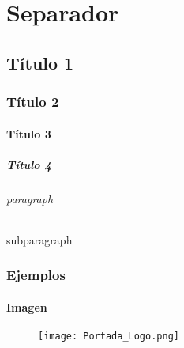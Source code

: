 \documentclass[12pt, twoside, openright]{report} %
\begin{document}



\part{Separador}
\chapter{Título 1}
\section{Título 2}
\subsection{Título 3}
\subsubsection{Título 4}
\paragraph{paragraph}
\subparagraph{subparagraph}

\newpage

\section{Ejemplos}

\subsection{Imagen}
\begin{figure}[H]
  {\texttt{[image: Portada\_Logo.png]}}
\end{figure}
\end{document}
